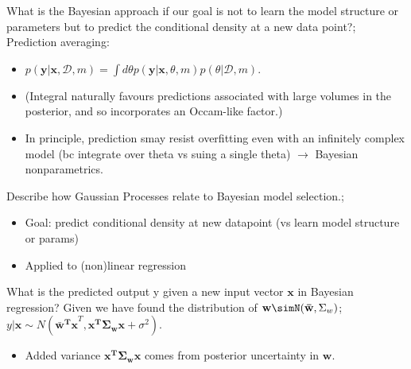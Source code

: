 \documentclass{article}
\begin{document}

What is the Bayesian approach if our goal is not to learn the model structure or parameters but to predict the conditional density at a new data point?; Prediction averaging: \begin{itemize} \item  $p(\mathbf{y|x}, \mathcal{D}, m)=\int d\theta p(\mathbf{y|x}, \theta, m)p(\theta|\mathcal{D}, m)$.  \item (Integral naturally favours predictions associated with  large volumes in the posterior, and so incorporates an Occam-like factor.) \item In principle, prediction smay resist overfitting even with an infinitely complex model (bc integrate over theta vs suing a single theta) $\rightarrow$ Bayesian nonparametrics.  \end{itemize} 

Describe how Gaussian Processes relate to Bayesian model selection.; \begin{itemize} \item Goal: predict conditional density at new datapoint (vs learn model structure or params) \item Applied to (non)linear regression \end{itemize}

What is the predicted output y given a new input vector $\mathbf{x}$ in Bayesian regression? Given we have found the distribution of $\mathbf{w}\simN(\mathbf{\bar{w}}, \Sigma_w)$; $y|\mathbf{x}\sim N(\mathbf{\bar{w}^Tx}^T, \mathbf{x^T\Sigma_w x}+\sigma^2)$. \begin{itemize} \item Added variance $\mathbf{x^T\Sigma_w x}$ comes from posterior uncertainty in $\mathbf{w}$.  \end{itemize}
\end{document}
